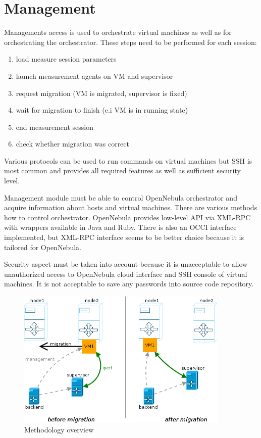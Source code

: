 \section{Management}
Managements access is used to orchestrate virtual machines as well as for orchestrating the orchestrator. These steps need to be performed for each session: 
\begin{enumerate}
	\item load measure session parameters
	\item launch measurement agents on \Ac{VM} and supervisor
	\item request migration (\Ac{VM} is migrated, supervisor is fixed)
	\item wait for migration to finish (e.i \Ac{VM} is in running state)
	\item end measurement session
	\item check whether migration was correct
\end{enumerate}

Various protocols can be used to run commands on virtual machines but \Ac{SSH} is most common and provides all required features as well as sufficient security level. 

Management module must be able to control OpenNebula orchestrator and acquire information about hosts and virtual machines. There are various methods how to control orchestrator. OpenNebula provides low-level \Ac{API} via \Ac{XML}-\Ac{RPC} with wrappers available in Java and Ruby. There is also an \Ac{OCCI} interface implemented, but \Ac{XML}-\Ac{RPC} interface seems to be better choice because it is tailored for OpenNebula.

Security aspect must be taken into account because it is unacceptable to allow unauthorized access to OpenNebula cloud interface and \Ac{SSH} console of virtual machines. It is not acceptable to save any passwords into source code repository. 

\begin{figure}[htb]
	\begin{center}
	\includegraphics[width=0.9\textwidth]{methodology.png}
	\end{center}
	\caption{Methodology overview}
	\label{img:methodology}
\end{figure}



